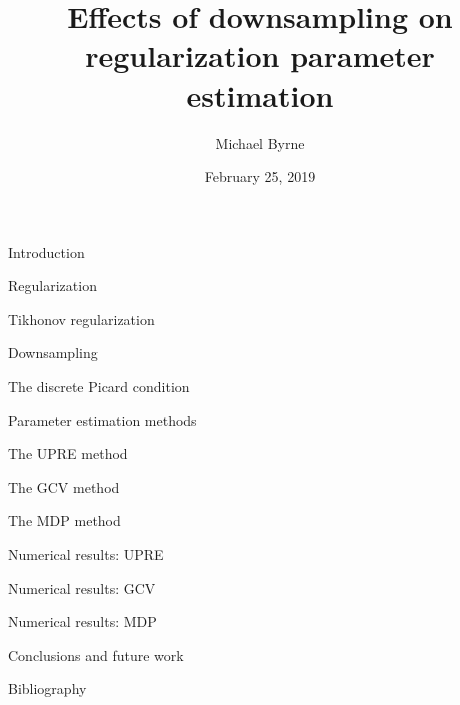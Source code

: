 \documentclass[12pt]{beamer}
\author{Michael Byrne}
\title{Effects of downsampling on regularization parameter estimation}
\institute{Arizona State University}
\date{February 25, 2019}
\begin{document}
\begin{frame}
\titlepage
\end{frame}


\begin{frame}{Introduction}

\end{frame}

\begin{frame}{Regularization}

\end{frame}

\begin{frame}{Tikhonov regularization}

\end{frame}

\begin{frame}{Downsampling}

\end{frame}

\begin{frame}{The discrete Picard condition}

\end{frame}

\begin{frame}{Parameter estimation methods}

\end{frame}

\begin{frame}{The UPRE method}

\end{frame}

\begin{frame}{The GCV method}

\end{frame}

\begin{frame}{The MDP method}

\end{frame}

\begin{frame}{Numerical results: UPRE}

\end{frame}

\begin{frame}{Numerical results: GCV}

\end{frame}

\begin{frame}{Numerical results: MDP}

\end{frame}

\begin{frame}{Conclusions and future work}

\end{frame}

\begin{frame}{Bibliography}

\end{frame}
\end{document}
